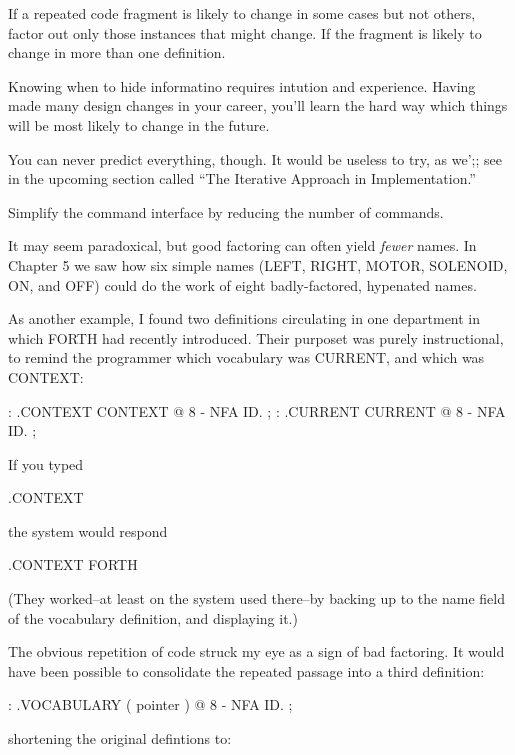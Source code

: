 \begin{tip}
If a repeated code fragment is likely to change in some cases but not others, factor out only those instances that might change. If the fragment is likely to change in more than one definition.
\end{tip}
Knowing when to hide informatino requires intution and experience. Having made many design changes in your career, you'll learn the hard way which things will be most likely to change in the future.

You can never predict everything, though. It would be useless to try, as we';; see in the upcoming section called ``The Iterative Approach in Implementation.''

\begin{tip}
Simplify the command interface by reducing the number of commands.
\end{tip}
It may seem paradoxical, but good factoring can often yield \emph{fewer} names. In Chapter 5 we saw how six simple names (LEFT, RIGHT, MOTOR, SOLENOID, ON, and OFF) could do the work of eight badly-factored, hypenated names.

As another example, I found two definitions circulating in one department in which FORTH had recently introduced. Their purposet was purely instructional, to remind the programmer which vocabulary was CURRENT, and which was CONTEXT:

\begin{Code}
: .CONTEXT   CONTEXT @  8 -  NFA  ID. ;
: .CURRENT   CURRENT @  8 -  NFA  ID. ;
\end{Code}
If you typed

\begin{Code}
.CONTEXT
\end{Code}
the system would respond


\begin{Code}
.CONTEXT FORTH
\end{Code}
(They worked--at least on the system used there--by backing up to the name field of the vocabulary definition, and displaying it.)

The obvious repetition of code struck my eye as a sign of bad factoring. It would have been possible to consolidate the repeated passage into a third definition:

\begin{Code}
: .VOCABULARY   ( pointer )  @  8 -  NFA  ID. ;
\end{Code}
shortening the original defintions to:


